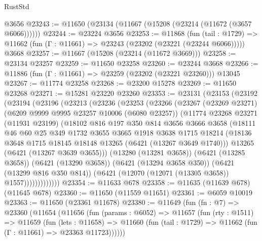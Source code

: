 \begin{lexlean}{RustStd}
\begin{coremodule}
    @3656
@23243 := @11650 (@23134 (@11667 (@15208 (@23214 (@11672 (@3657 @6066))))))
@23244 := @23224 @3656
@23253 := @11868
    (fun (tail : @1729) => @11662 (fun (Γ : @11661) => @23243 (@23202 (@23221 (@23244 @6066)))))
    @3668
@23257 := @11667 (@15208 (@23214 (@11672 @3669)))
@23258 := @23134 @23257
@23259 := @11650 @23258
@23260 := @23244 @3668
@23266 := @11886 (fun (Γ : @11661) => @23259 (@23202 (@23221 @23260))) @13045
@23267 := @11774 @23258
@23268 := @23200 @15278
@23269 := @11650 @23268
@23271 := @15281 @23220 @23260
@23353 := @23131
    (@23153
      (@23192
        (@23194
          (@23196
            (@23213
              (@23236
                (@23253
                  (@23266
                    (@23267
                      (@23269 @23271)
                      (@6209 @9999 @9995 @23257 @10006 (@6080 @23257))
                      (@11774
                        @23268
                        @23271
                        (@11931 @23199)
                        (@18102
                          @816
                          @197
                          @350
                          @814
                          @3656
                          @3666
                          @3658
                          (@18111
                            @46
                            @60
                            @25
                            @349
                            @1732
                            @3655
                            @3665
                            @1918
                            @3638
                            @1715
                            @18214
                            (@18136 @3648 @1715 @18145 @18148 @13265 (@6421 (@13267 @3649 @1740)))
                            @13265
                            (@6421 (@13267 @3639 @3655)))
                          (@13280 (@13281 @3658))
                          (@6421 (@13285 @3658))
                          (@6421 (@13290 @3658))
                          (@6421 (@13294 @3658 @350))
                          (@6421 (@13299 @816 @350 @814))
                          (@6421 (@12070 (@12071 (@13305 @3658)) @1557)))))))))))))
@23354 := @11633 @678
@23358 := @11635 (@11639 @678) (@11645 @678)
@23360 := @11650 (@11559 @11651)
@23361 := @6059 @10019
@23363 := @11650 (@23361 @11678)
@23380 := @11649
    (fun (fn : @7) =>
    @23360
      (@11654
        (@11656
          (fun (params : @6052) =>
          @11657
            (fun (rty : @1511) =>
            @11659
              (fun (lets : @11658) =>
              @11660 (fun (tail : @1729) => @11662 (fun (Γ : @11661) => @23363 @11723))))))

\end{coremodule}
\end{lexlean}
